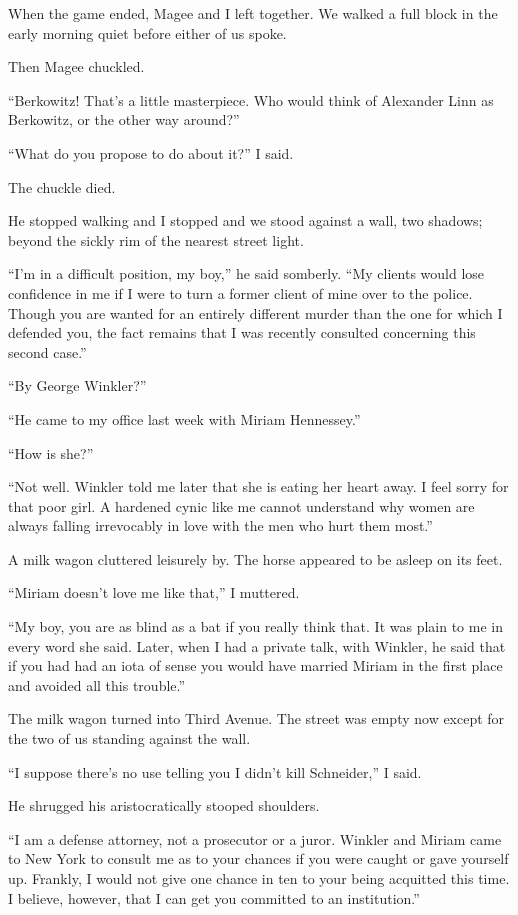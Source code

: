 \documentclass{novel}
\begin{document}
\scenestars

When the game ended, Magee and I left together. We walked a full block in the early morning quiet before either of us spoke. 

Then Magee chuckled.

“Berkowitz! That’s a little masterpiece. Who would think of Alexander Linn as Berkowitz, or the other way around?”

“What do you propose to do about it?” I said.

The chuckle died.

He stopped walking and I stopped and we stood against a wall, two shadows; beyond the sickly rim of the nearest street light.

“I’m in a difficult position, my boy,” he said somberly. “My clients would lose confidence in me if I were to turn a former client of mine over to the police. Though you are wanted for an entirely different murder than the one for which I defended you, the fact remains that I was recently consulted concerning this second case.”

“By George Winkler?”

“He came to my office last week with Miriam Hennessey.”

“How is she?”

“Not well. Winkler told me later that she is eating her heart away. I feel sorry for that poor girl. A hardened cynic like me cannot understand why women are always falling irrevocably in love with the men who hurt them most.”

A milk wagon cluttered leisurely by. The horse \mbox{appeared} to be asleep on its feet.

“Miriam doesn’t love me like that,” I muttered.

“My boy, you are as blind as a bat if you really think that. It was plain to me in every word she said. Later, when I had a private talk, with Winkler, he said that if you had had an iota of sense you would have married Miriam in the first place and avoided all this trouble.”

The milk wagon turned into Third Avenue. The street was empty now except for the two of us standing against the wall.

“I suppose there’s no use telling you I didn’t kill \mbox{Schneider},” I said.

He shrugged his aristocratically stooped shoulders.

“I am a defense attorney, not a prosecutor or a juror. Winkler and Miriam came to New York to consult me as to your chances if you were caught or gave yourself up. Frankly, I would not give one chance in ten to your being acquitted this time. I believe, however, that I can get you committed to an institution.”
\end{document}
